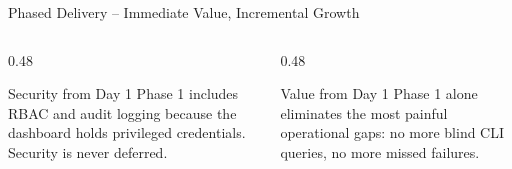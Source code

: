 \begin{frame}{Phased Delivery -- Immediate Value, Incremental Growth}
\begin{center}
  \end{center}

  \vspace{0.2cm}

  \begin{columns}[T]
    \begin{column}{0.48\textwidth}
      \begin{alertblock}{Security from Day 1}
        \scriptsize
        Phase 1 includes RBAC and audit logging because the dashboard holds
        privileged credentials. Security is never deferred.
      \end{alertblock}
    \end{column}
    \begin{column}{0.48\textwidth}
      \begin{exampleblock}{Value from Day 1}
        \scriptsize
        Phase 1 alone eliminates the most painful operational gaps:
        no more blind CLI queries, no more missed failures.
      \end{exampleblock}
    \end{column}
  \end{columns}
\end{frame}
